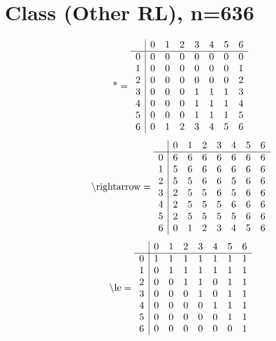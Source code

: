 \documentclass[11pt]{article}
\begin{document}
\section{Class (Other RL), n=636}
\[\text{*} = 
\begin{array}{r | r r r r r r r}
 & 0 & 1 & 2 & 3 & 4 & 5 & 6 \\ \hline
0 & 0 & 0 & 0 & 0 & 0 & 0 & 0 \\
1 & 0 & 0 & 0 & 0 & 0 & 0 & 1 \\
2 & 0 & 0 & 0 & 0 & 0 & 0 & 2 \\
3 & 0 & 0 & 0 & 1 & 1 & 1 & 3 \\
4 & 0 & 0 & 0 & 1 & 1 & 1 & 4 \\
5 & 0 & 0 & 0 & 1 & 1 & 1 & 5 \\
6 & 0 & 1 & 2 & 3 & 4 & 5 & 6 \\
\end{array}
\]
\[\text{\textbackslash rightarrow} = 
\begin{array}{r | r r r r r r r}
 & 0 & 1 & 2 & 3 & 4 & 5 & 6 \\ \hline
0 & 6 & 6 & 6 & 6 & 6 & 6 & 6 \\
1 & 5 & 6 & 6 & 6 & 6 & 6 & 6 \\
2 & 5 & 5 & 6 & 6 & 5 & 6 & 6 \\
3 & 2 & 5 & 5 & 6 & 5 & 6 & 6 \\
4 & 2 & 5 & 5 & 5 & 6 & 6 & 6 \\
5 & 2 & 5 & 5 & 5 & 5 & 6 & 6 \\
6 & 0 & 1 & 2 & 3 & 4 & 5 & 6 \\
\end{array}
\]
\[\text{\textbackslash le} = 
\begin{array}{r | r r r r r r r}
 & 0 & 1 & 2 & 3 & 4 & 5 & 6 \\ \hline
0 & 1 & 1 & 1 & 1 & 1 & 1 & 1 \\
1 & 0 & 1 & 1 & 1 & 1 & 1 & 1 \\
2 & 0 & 0 & 1 & 1 & 0 & 1 & 1 \\
3 & 0 & 0 & 0 & 1 & 0 & 1 & 1 \\
4 & 0 & 0 & 0 & 0 & 1 & 1 & 1 \\
5 & 0 & 0 & 0 & 0 & 0 & 1 & 1 \\
6 & 0 & 0 & 0 & 0 & 0 & 0 & 1 \\
\end{array}
\]
\end{document}
